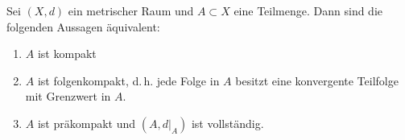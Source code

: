 \begin{thSatz} \label{vl15:satz7.2}
    Sei $(X,d)$ ein metrischer Raum und $A\subset X$ eine Teilmenge. Dann sind
    die folgenden Aussagen äquivalent:
    \begin{enumerate}[(1)]
        \item \label{vl15:satz7.2:1}
            $A$ ist kompakt
        
        \item \label{vl15:satz7.2:2}
            $A$ ist folgenkompakt, d.\,h. jede Folge in $A$ besitzt eine
            konvergente Teilfolge mit Grenzwert in $A$.
            
        \item \label{vl15:satz7.2:3}
            $A$ ist präkompakt und $(A,d\vert_A)$ ist vollständig.
    \end{enumerate}
\end{thSatz}

